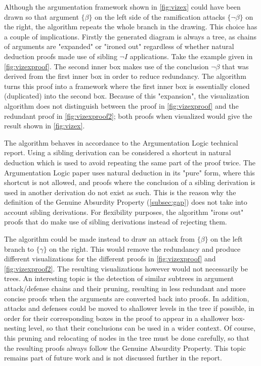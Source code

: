 \documentclass[11pt,twoside,a4paper]{report}
\begin{document}
Although the argumentation framework shown in \autoref{fig:vizex} could have been drawn so that argument $\{\beta\}$ on the left side of the ramification attacks $\{\neg\beta\}$ on the right, the algorithm repeats the whole branch in the drawing. This choice has a couple of implications. Firstly the generated diagram is always a tree, as chains of arguments are "expanded" or "ironed out" regardless of whether natural deduction proofs made use of sibling $\neg I$ applications. Take the example given in \autoref{fig:vizexproof}. The second inner box makes use of the conclusion $\neg\beta$ that was derived from the first inner box in order to reduce redundancy. The algorithm turns this proof into a framework where the first inner box is essentially cloned (duplicated) into the second box. Because of this "expansion", the visualization algorithm does not distinguish between the proof in \autoref{fig:vizexproof} and the redundant proof in \autoref{fig:vizexproof2}; both proofs when visualized would give the result shown in \autoref{fig:vizex}.

The algorithm behaves in accordance to the Argumentation Logic technical report. Using a sibling derivation can be considered a shortcut in natural deduction which is used to avoid repeating the same part of the proof twice. The Argumentation Logic paper uses natural deduction in its "pure" form, where this shortcut is not allowed, and proofs where the conclusion of a sibling derivation is used in another derivation do not exist as such. This is the reason why the definition of the Genuine Absurdity Property (\autoref{subsec:gap}) does not take into account sibling derivations. For flexibility purposes, the algorithm "irons out" proofs that do make use of sibling derivations instead of rejecting them.

The algorithm could be made instead to draw an attack from $\{\beta\}$ on the left branch to $\{\gamma\}$ on the right. This would remove the redundancy and produce different visualizations for the different proofs in \autoref{fig:vizexproof} and \autoref{fig:vizexproof2}. The resulting visualizations however would not necessarily be trees. An interesting topic is the detection of similar subtrees in argument attack/defense chains and their pruning, resulting in less redundant and more concise proofs when the arguments are converted back into proofs. In addition, attacks and defenses could be moved to shallower levels in the tree if possible, in order for their corresponding boxes in the proof to appear in a shallower box-nesting level, so that their conclusions can be used in a wider context. Of course, this pruning and relocating of nodes in the tree must be done carefully, so that the resulting proofs always follow the Genuine Absurdity Property. This topic remains part of future work and is not discussed further in the report.
\end{document}
